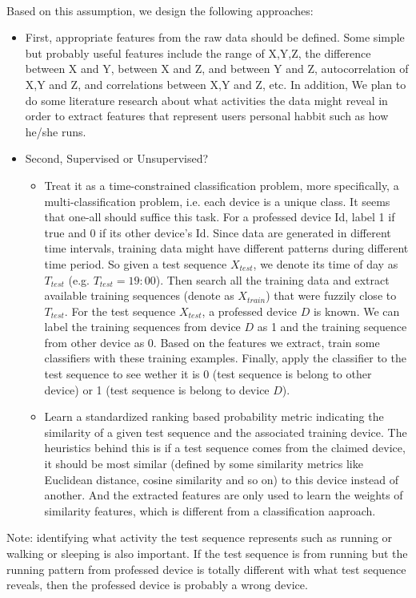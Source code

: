 \documentclass{article}
\begin{document}
	\paragraph{} Based on this assumption, we design the following approaches:
	\begin{itemize}
		\item First, appropriate features from the raw data should be defined. Some simple but probably useful features include the range of X,Y,Z, the difference between X and Y, between X and Z, and between Y and Z, autocorrelation of X,Y and Z, and correlations between X,Y and Z, etc. In addition, We plan to do some literature research about what activities the data might reveal in order to extract features that represent users personal habbit such as how he/she runs. 
		\item Second, Supervised or Unsupervised?
			\begin{itemize}
			\item Treat it as a time-constrained classification problem, more specifically, a multi-classification problem, i.e. each device is a unique class. It seems that one-all should suffice this task. For a professed device Id, label 1 if true and 0 if its other device's Id. Since data are generated in different time intervals, training data might have different patterns during different time period. So given a test sequence $X_{test}$, we denote its time of day as $T_{test}$ (e.g. $T_{test}=19:00$). Then search all the training data and extract available training sequences (denote as $X_{train}$) that were fuzzily close to $T_{test}$. For the test sequence $X_{test}$, a professed device $D$ is known. We can label the training sequences from device $D$ as 1 and the training sequence from other device as 0. Based on the features we extract, train some classifiers with these training examples. Finally, apply the classifier to the test sequence to see wether it is 0 (test sequence is belong to other device) or 1 (test sequence is belong to device $D$).\\
			\item Learn a standardized ranking based probability metric indicating the similarity of a given test sequence and the associated training device. The heuristics behind this is if a test sequence comes from the claimed device, it should be most similar (defined by some similarity metrics like Euclidean distance, cosine similarity and so on) to this device instead of another. And the extracted features are only used to learn the weights of similarity features, which is different from a classification aaproach.
			\end{itemize}
	\end{itemize}
	Note: identifying what activity the test sequence represents such as running or walking or sleeping is also important. If the test sequence is from running but the running pattern from professed device is totally different with what test sequence reveals, then the professed device is probably a wrong device. 
\end{document}
